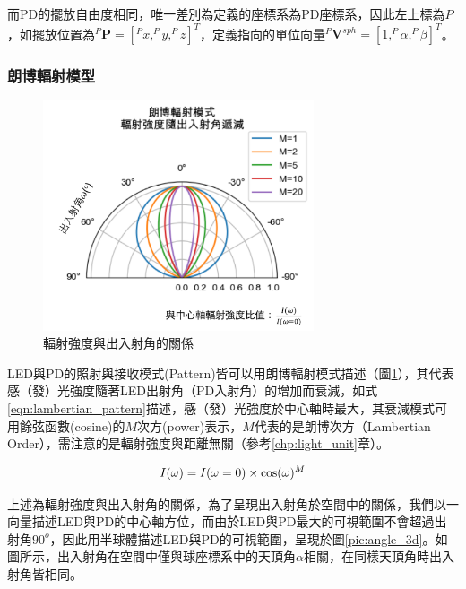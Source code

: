         \qquad

       而PD的擺放自由度相同，唯一差別為定義的座標系為PD座標系，因此左上標為$P$，如擺放位置為$^P \boldsymbol{P}=[^Px,^Py,^Pz]^T$，定義指向的單位向量$^P\boldsymbol{V}^{sph}=[1,^P\alpha,^P\beta]^T$。
        




        \subsubsection{朗博輻射模型}
        \label{chp:lambertian}

        \begin{figure}[h]
            \centering
            \includegraphics[width=8cm]{ch2pic/lambertian.png}
            \caption{輻射強度與出入射角的關係}
            \label{pic:lambertian}
        \end{figure}

        LED與PD的照射與接收模式(Pattern)皆可以用朗博輻射模式描述（圖\ref{pic:lambertian}），其代表感（發）光強度隨著LED出射角（PD入射角）的增加而衰減，如式\ref{eqn:lambertian_pattern}描述，感（發）光強度於中心軸時最大，其衰減模式可用餘弦函數(cosine)的$M$次方(power)表示，$M$代表的是朗博次方（Lambertian Order），需注意的是輻射強度與距離無關（參考\ref{chp:light_unit}章）。

        \begin{equation}
            \label{eqn:lambertian_pattern}
            I(\omega)=I(\omega=0)\times\cos(\omega)^{M}\\
        \end{equation}

     
        上述為輻射強度與出入射角的關係，為了呈現出入射角於空間中的關係，我們以一向量描述LED與PD的中心軸方位，而由於LED與PD最大的可視範圍不會超過出射角$90^{o}$，因此用半球體描述LED與PD的可視範圍，呈現於圖\ref{pic:angle_3d}。如圖所示，出入射角在空間中僅與球座標系中的天頂角$\alpha$相關，在同樣天頂角時出入射角皆相同。

